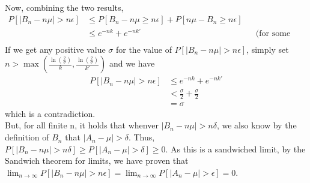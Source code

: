 Now, combining the two results,
\begin{align*}
    P[\lvert B_n - n\mu\rvert > n\epsilon] &\le P[B_n - n\mu \ge n\epsilon] + P[n\mu - B_n \ge n\epsilon]\\
    &\le e^{-nk} + e^{-nk'} && \text{(for some positive coefficients k and k')}\\
\end{align*}
If we get any positive value $\sigma$ for the value of $P[\lvert B_n - n\mu\rvert > n\epsilon]$, simply set $n > \max(\frac{\ln(\frac{2}{\sigma})}{k}, \frac{\ln(\frac{2}{\sigma})}{k'})$ and we have
\begin{align*}
    P[\lvert B_n - n\mu\rvert > n\epsilon] &\le e^{-nk} + e^{-nk'}\\
    &< \frac{\sigma}{2} + \frac{\sigma}{2}\\
    &= \sigma
\end{align*}
which is a contradiction.\\
But, for all finite n, it holds that whenver $\lvert B_n-n\mu\rvert > n\delta$, we also know by the definition of $B_n$ that $\lvert A_n-\mu\rvert > \delta$. Thus, $P[\lvert B_n-n\mu\rvert > n\delta] \ge P[\lvert A_n-\mu\rvert > \delta] \ge 0$. As this is a sandwiched limit, by the Sandwich theorem for limits, we have proven that $\lim_{n\to \infty}P[\lvert B_n - n\mu\rvert > n\epsilon]=\lim_{n\to \infty}P[\lvert A_n - \mu\rvert > \epsilon]=0$.\\